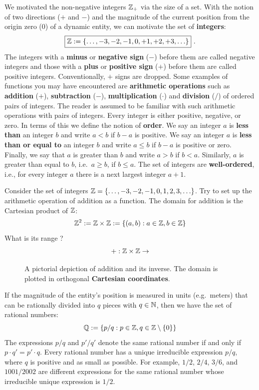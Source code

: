 We motivated the non-negative integers $\mathbb{Z}_+$ via the size of a set.  With the notion of two directions ($+$ and $-$) and the magnitude of the current position from the origin zero ($0$) of a dynamic entity, we can motivate the set of {\bf integers}:
$$\boxed{\mathbb{Z} := \{\ldots,-3,-2,-1,0,+1,+2,+3,\ldots\}} \ .$$
The integers with a {\bf minus} or {\bf negative sign} ($-$) before them are called negative integers and those with a {\bf plus} or {\bf positive sign} ($+$) before them are called positive integers.  Conventionally, $+$ signs are dropped.  Some examples of functions you may have encountered are {\bf arithmetic operations} such as {\bf addition} ($+$), {\bf subtraction} ($-$), {\bf multiplication} ($\cdot$) and {\bf division} ($/$) of ordered pairs of integers.  The reader is assumed to be familiar with such arithmetic operations with pairs of integers.  Every integer is either positive, negative, or zero.  In terms of this we define the notion of {\bf order}.  We say an integer $a$ is {\bf less than} an integer $b$ and write $a < b$ if $b-a$ is positive.  We say an integer $a$ is {\bf less than or equal to} an integer $b$ and write $a \leq b$ if $b-a$ is positive or zero.  Finally, we say that $a$ is greater than $b$ and write $a > b$ if $b<a$.  Similarly, $a$ is greater than equal to $b$, i.e.~$a \geq b$, if $b \leq a$.  The set of integers are {\bf well-ordered}, i.e., for every integer $a$ there is a next largest integer $a+1$.

\begin{classwork}\label{CW:AdditionMapAndItsInverseMap}
Consider the set of integers $\mathbb{Z} = \{\ldots,-3,-2,-1,0,1,2,3,\ldots\}$.  Try to set up the arithmetic operation of addition as a function.  The domain for addition is the Cartesian product of $\mathbb{Z}$:
\[
 \mathbb{Z}^2 := \mathbb{Z} \times \mathbb{Z} := \{(a,b) : a \in \mathbb{Z}, b \in \mathbb{Z} \}
\]
What is its range ?
\[
+ : \mathbb{Z} \times \mathbb{Z} \to
\]
\begin{figure}[htpb]
\caption{A pictorial depiction of addition and its inverse.  The domain is plotted in orthogonal  {\bf Cartesian coordinates}.\label{F:Addfunction}}
\vspace{5cm}
\end{figure}
\end{classwork}

If the magnitude of the entity's position is measured in units (e.g.~meters) that can be rationally divided into $q$ pieces with $q \in \mathbb{N}$, then we have the set of rational numbers:
\[
\mathbb{Q} := \{ {p}/{q} : p \in \mathbb{Z}, q \in \mathbb{Z} \setminus \{0\} \}
\]
The expressions $p/q$ and $p'/q'$ denote the same rational number if and only if $p \cdot q'=p' \cdot q$.  Every rational number has a unique irreducible expression $p/q$, where $q$ is positive and as small as possible.  For example, $1/2$, $2/4$, $3/6$, and $1001/2002$ are different expressions for the same rational number whose irreducible unique expression is $1/2$.

